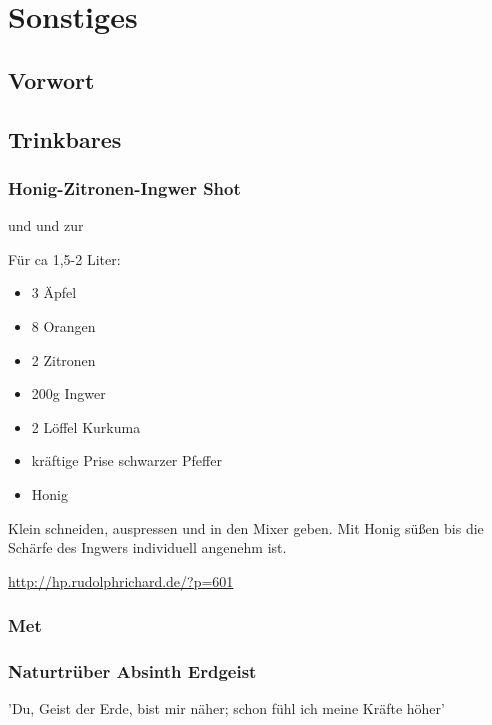 \chapter{Sonstiges}

\section{Vorwort}

\lipsum[1-5]
\newpage





\section{Trinkbares}


\subsection{Honig-Zitronen-Ingwer Shot}

 und  und zur 

Für ca 1,5-2 Liter:
\begin{itemize}
	\item 3 Äpfel
	\item 8 Orangen
	\item 2 Zitronen
	\item 200g Ingwer
	\item 2 Löffel Kurkuma
	\item kräftige Prise schwarzer Pfeffer
	\item Honig
\end{itemize}

Klein schneiden, auspressen und in den Mixer geben. Mit Honig süßen bis die Schärfe des Ingwers individuell angenehm ist.

\url{http://hp.rudolphrichard.de/?p=601}

\subsection{Met}

\subsection{Naturtrüber Absinth Erdgeist}

'Du, Geist der Erde, bist mir näher; schon fühl ich meine Kräfte höher'

